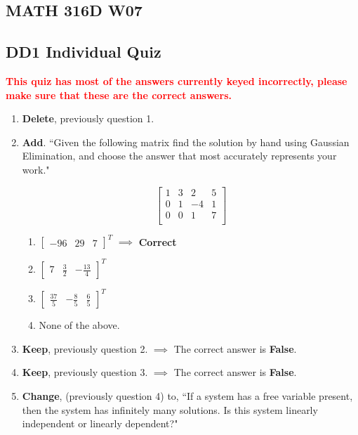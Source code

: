 \documentclass[fleqn]{article}[11pt]
\begin{document}
	
\begin{center}\section*{MATH 316D W07}\end{center}
\subsection*{DD1 Individual Quiz}

\textcolor{red}{\textbf{This quiz has most of the answers currently keyed incorrectly, please make sure that these are the correct answers.}}

\begin{enumerate}
	\item \textbf{Delete}, previously question 1.
	\item \textbf{Add}. ``Given the following matrix find the solution by hand using Gaussian Elimination, and choose the answer that most accurately represents your work."
	
	 \begin{equation*}
		\begin{bmatrix} 1 & 3 & 2 & 5 \\
		0 & 1 & -4 & 1 \\
		0 & 0 & 1 & 7 \\
		\end{bmatrix}
	\end{equation*}
	
		\begin{enumerate}
			\item $\begin{bmatrix}-96 & 29 & 7\end{bmatrix}^{T}$ $\implies$ \textbf{Correct}
			\item $\begin{bmatrix}7 & \frac{3}{2} & -\frac{13}{4}\end{bmatrix}^{T}$
			\item $\begin{bmatrix}\frac{37}{5} & -\frac{8}{5} & \frac{6}{5}\end{bmatrix}^{T}$
			\item None of the above.
		\end{enumerate}
	\item \textbf{Keep}, previously question 2. $\implies$ The correct answer is \textbf{False}.
	\item \textbf{Keep}, previously question 3.  $\implies$ The correct answer is \textbf{False}.
	\item \textbf{Change}, (previously question 4) to, ``If a system has a free variable present, then the system has infinitely many solutions. Is this system linearly independent or linearly dependent?"
	

\end{enumerate}
\end{document}
